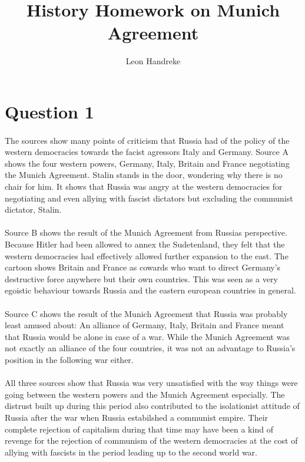 \documentclass[11pt]{article}
\title{History Homework on Munich Agreement}
\author{Leon Handreke}
\date{}                                           %
\begin{document}
\maketitle
{}\selectfont

\section*{Question 1}
\paragraph{}
The sources show many points of criticism that Russia had of the policy of the western democracies towards the facist agressors Italy and Germany. Source A shows the four western powers, Germany, Italy, Britain and France negotiating the Munich Agreement. Stalin stands in the door, wondering why there is no chair for him. It shows that Russia was angry at the western democracies for negotiating and even allying with fascist dictators but excluding the communist dictator, Stalin.

\paragraph{}
Source B shows the result of the Munich Agreement from Russias perspective. Because Hitler had been allowed to annex the Sudetenland, they felt that the western democracies had effectively allowed further expansion to the east. The cartoon shows Britain and France as cowards who want to direct Germany's destructive force anywhere but their own countries. This was seen as a very egoistic behaviour towards Russia and the eastern european countries in general.

\paragraph{}
Source C shows the result of the Munich Agreement that Russia was probably least amused about: An alliance of Germany, Italy, Britain and France meant that Russia would be alone in case of a war. While the Munich Agreement was not exactly an alliance of the four countries, it was not an advantage to Russia's position in the following war either.

\paragraph{}
All three sources show that Russia was very unsatisfied with the way things were going between the western powers and the Munich Agreement especially. The distrust built up during this period also contributed to the isolationist attitude of Russia after the war when Russia estabilshed a communist empire. Their complete rejection of capitalism during that time may have been a kind of revenge for the rejection of communism of the western democracies at the cost of allying with fascists in the period leading up to the second world war.
\end{document}
